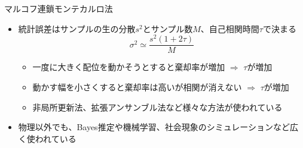\begin{frame}[t,fragile]{マルコフ連鎖モンテカルロ法}
  \begin{itemize}
  \item 統計誤差はサンプルの生の分散$s^2$とサンプル数$M$、自己相関時間$\tau$で決まる
    \[
    \sigma^2 \simeq \frac{s^2 (1+2\tau)}{M}
    \]
    \begin{itemize}
    \item 一度に大きく配位を動かそうとすると棄却率が増加 $\Rightarrow$ $\tau$が増加
    \item 動かす幅を小さくすると棄却率は高いが相関が消えない $\Rightarrow$ $\tau$が増加
    \item 非局所更新法、拡張アンサンブル法など様々な方法が使われている
    \end{itemize}
  \item 物理以外でも、Bayes推定や機械学習、社会現象のシミュレーションなど広く使われている
  \end{itemize}
\end{frame}
